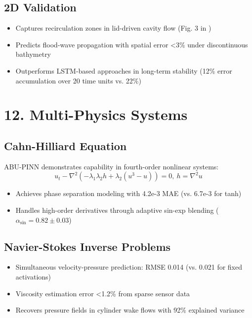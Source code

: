 \subsection*{2D Validation}
\begin{itemize}
    \item Captures recirculation zones in lid-driven cavity flow (Fig. 3 in \cite{free_surface})
    \item Predicts flood-wave propagation with spatial error <3\% under discontinuous bathymetry
    \item Outperforms LSTM-based approaches in long-term stability (12\% error accumulation over 20 time units vs. 22\%)
\end{itemize}

\section*{12. Multi-Physics Systems}
\subsection*{Cahn-Hilliard Equation}
ABU-PINN demonstrates capability in fourth-order nonlinear systems:
\[
u_t - \nabla^2(-\lambda_1\lambda_2 h + \lambda_2(u^3 - u)) = 0,\ h = \nabla^2 u
\]
\begin{itemize}
    \item Achieves phase separation modeling with 4.2e-3 MAE (vs. 6.7e-3 for tanh)
    \item Handles high-order derivatives through adaptive sin-exp blending (\(\alpha_{\text{sin}} = 0.82\pm0.03\))
\end{itemize}

\subsection*{Navier-Stokes Inverse Problems}
\begin{itemize}
    \item Simultaneous velocity-pressure prediction: RMSE 0.014 (vs. 0.021 for fixed activations)
    \item Viscosity estimation error <1.2\% from sparse sensor data
    \item Recovers pressure fields in cylinder wake flows with 92\% explained variance
\end{itemize}


